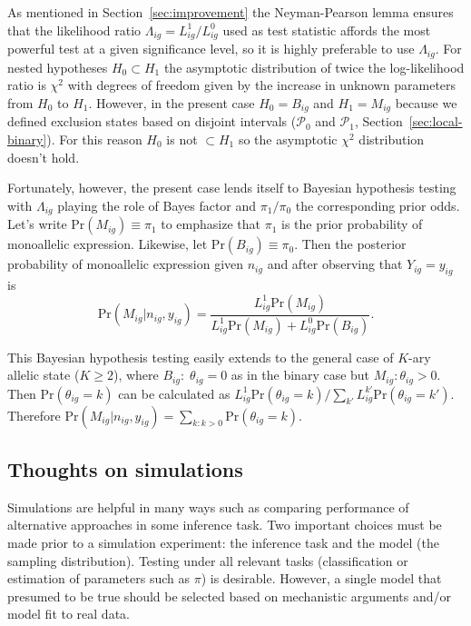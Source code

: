 \documentclass[letterpaper]{article}
\begin{document}
As mentioned in Section~\ref{sec:improvement} the Neyman-Pearson lemma ensures
that the likelihood ratio \(\Lambda_{ig}=L_{ig}^1/L_{ig}^0\) used as test
statistic affords the most powerful test at a given significance level, so it
is highly preferable to use \(\Lambda_{ig}\).  For nested hypotheses
\(H_0\subset H_1\) the asymptotic distribution of twice the log-likelihood
ratio is \(\chi^2\) with degrees of freedom given by the increase in unknown
parameters from \(H_0\) to \(H_1\).  However, in the present case
\(H_0=B_{ig}\) and \(H_1=M_{ig}\) because we defined exclusion states based on
disjoint intervals (\(\mathcal{P}_0\) and \(\mathcal{P}_1\),
Section~\ref{sec:local-binary}).  For this reason \(H_0\) is not \(\subset H_1\)
so the asymptotic \(\chi^2\) distribution doesn't hold.

Fortunately, however, the present case lends itself to Bayesian hypothesis
testing with \(\Lambda_{ig}\) playing the role of Bayes factor and
\(\pi_1/\pi_0\) the corresponding prior odds.  Let's write
\(\mathrm{Pr}(M_{ig})\equiv\pi_1\) to emphasize that \(\pi_1\) is the prior
probability of monoallelic expression. Likewise, let
\(\mathrm{Pr}(B_{ig})\equiv\pi_0\).  Then the posterior probability of
monoallelic expression given \(n_{ig}\) and after observing that
\(Y_{ig}=y_{ig}\) is
\begin{equation}
\label{eq:hypothesis-posterior}
\mathrm{Pr}(M_{ig}|n_{ig},y_{ig}) =
\frac{L_{ig}^1 \mathrm{Pr}(M_{ig})}{{L_{ig}^1 \mathrm{Pr}(M_{ig})} + {L_{ig}^0
\mathrm{Pr}(B_{ig})}}.
\end{equation}

This Bayesian hypothesis testing easily extends to the general case of
\(K\)-ary allelic state (\(K\ge 2\)), where \(B_{ig} :\;
\theta_{ig}=0\) as in the binary case but \(M_{ig}: \theta_{ig}>0\).  Then
\(\mathrm{Pr}(\theta_{ig}=k)\) can be calculated as
\(
L_{ig}^1 \mathrm{Pr}(\theta_{ig}=k)
\big/
\sum_{k'} L_{ig}^{k'} \mathrm{Pr}(\theta_{ig}={k'})
\).  Therefore \(\mathrm{Pr}(M_{ig}|n_{ig},y_{ig}) = \sum_{k:k>0}
\mathrm{Pr}(\theta_{ig}=k)\).

\subsection{Thoughts on simulations}
\label{sec:simulation}

Simulations are helpful in many ways such as comparing performance of alternative approaches in
some inference task.  Two important choices must be made prior to a
simulation experiment: the inference task and the model (the sampling
distribution).  Testing under all relevant tasks (classification or estimation of parameters
such as \(\pi\)) is desirable.  However, a single model that presumed to be true should be selected based on mechanistic arguments and/or model fit to
real data.
\end{document}
